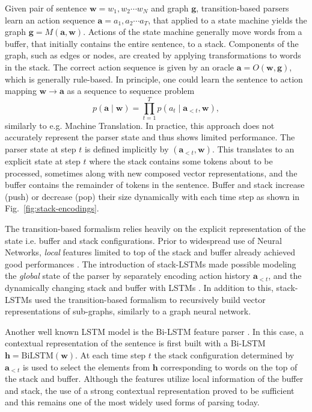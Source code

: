 \documentclass[11pt,a4paper]{article}
\begin{document}
Given pair of sentence $\mathbf{w} = w_1, w_2 \cdots w_N$ and graph $\mathbf{g}$, transition-based parsers learn an action sequence $\mathbf{a} = a_1, a_2 \cdots a_T$, that applied to a state machine yields the graph $\mathbf{g} = M(\mathbf{a}, \mathbf{w})$. Actions of the state machine generally move words from a buffer, that initially contains the entire sentence, to a stack. Components of the graph, such as edges or nodes, are created by applying transformations to words in the stack. The correct action sequence is given by an oracle $\mathbf{a} = O(\mathbf{w}, \mathbf{g})$, which is generally rule-based. In principle, one could learn the sentence to action mapping $\mathbf{w} \rightarrow \mathbf{a}$ as a sequence to sequence problem
\begin{equation}
p(\mathbf{a} \mid \mathbf{w}) = \prod_{t=1}^Tp(a_t \mid \mathbf{a}_{<t}, \mathbf{w})\nonumber,
\end{equation}
similarly to e.g. Machine Translation. In practice, this approach does not accurately represent the parser state and thus shows limited performance. The parser state at step $t$ is defined implicitly by $(\mathbf{a}_{<t}, \mathbf{w})$. This translates to an explicit state at step $t$ where the stack contains some tokens about to be processed, sometimes along with new composed vector representations, and the buffer contains the remainder of tokens in the sentence. Buffer and stack increase (push) or decrease (pop) their size dynamically with each time step as shown in Fig.~\ref{fig:stack-encodings}.

The transition-based formalism relies heavily on the explicit representation of the state i.e. buffer and stack configurations. Prior to widespread use of Neural Networks, \textit{local} features limited to top of the stack and buffer already achieved good performances \cite[inter-alia]{nivre2007maltparser,zhang-nivre-2011-transition}. The introduction of stack-LSTMs \cite{dyer2015transition} made possible modeling the \textit{global} state of the parser by separately encoding action history $\mathbf{a}_{<t}$, and the dynamically changing stack and buffer with LSTMs \cite{hochreiter1997long}. In addition to this, stack-LSTMs used the transition-based formalism to recursively build vector representations of sub-graphs, similarly to a graph neural network. 

Another well known LSTM model is the Bi-LSTM feature parser \cite{kiperwasser-goldberg-2016-simple,dozat2016deep}. In this case, a contextual representation of the sentence is first built with a Bi-LSTM $\mathbf{h}=\mathrm{BiLSTM}(\mathbf{w})$. At each time step $t$ the stack configuration determined by $\mathbf{a}_{<t}$ is used to select the elements from $\mathbf{h}$ corresponding to words on the top of the stack and buffer. Although the features utilize local information of the buffer and stack, the use of a strong contextual representation proved to be sufficient and this remains one of the most widely used forms of parsing today.
\end{document}
